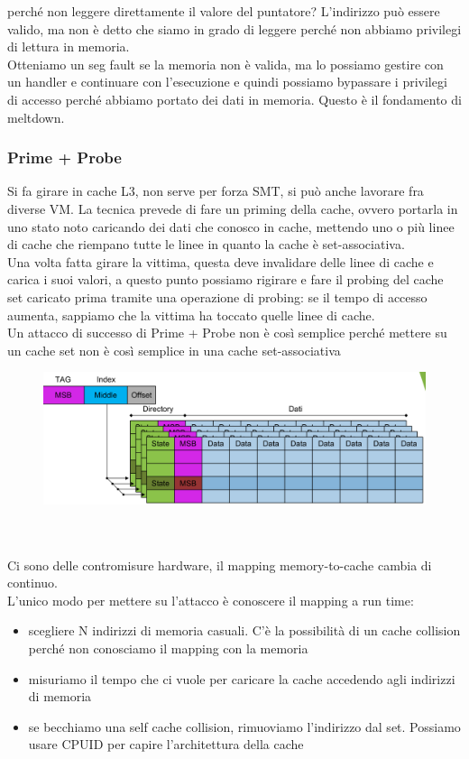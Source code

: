 \documentclass[12pt, oneside]{extbook} %
\begin{document}
perché non leggere direttamente il valore del puntatore? L'indirizzo può essere valido, ma non è detto che siamo in grado di leggere perché non abbiamo privilegi di lettura in memoria.\\ Otteniamo un seg fault se la memoria non è valida, ma lo possiamo gestire con un handler e continuare con l'esecuzione e quindi possiamo bypassare i privilegi di accesso perché abbiamo portato dei dati in memoria. Questo è il fondamento di meltdown.
\subsubsection{Prime + Probe}
Si fa girare in cache L3, non serve per forza SMT, si può anche lavorare fra diverse VM. La tecnica prevede di fare un priming della cache, ovvero portarla in uno stato noto caricando dei dati che conosco in cache, mettendo uno o più linee di cache che riempano tutte le linee in quanto la cache è set-associativa.\\ Una volta fatta girare la vittima, questa deve invalidare delle linee di cache e carica i suoi valori, a questo punto possiamo rigirare e fare il probing del cache set caricato prima tramite una operazione di probing: se il tempo di accesso aumenta, sappiamo che la vittima ha toccato quelle linee di cache.\\ Un attacco di successo di Prime + Probe non è così semplice perché mettere su un cache set non è così semplice in una cache set-associativa\\
\begin{figure}[!h]
	\includegraphics[scale=0.2]{immagini/prime_probe.png}
\end{figure}\\\\
Ci sono delle contromisure hardware, il mapping memory-to-cache cambia di continuo.\\L'unico modo per mettere su l'attacco è conoscere il mapping a run time:
\begin{itemize}
\item scegliere N indirizzi di memoria casuali. C'è la possibilità di un cache collision perché non conosciamo il mapping con la memoria
\item misuriamo il tempo che ci vuole per caricare la cache accedendo agli indirizzi di memoria
\item se becchiamo una self cache collision, rimuoviamo l'indirizzo dal set. Possiamo usare CPUID per capire l'architettura della cache
\end{itemize}
\end{document}

